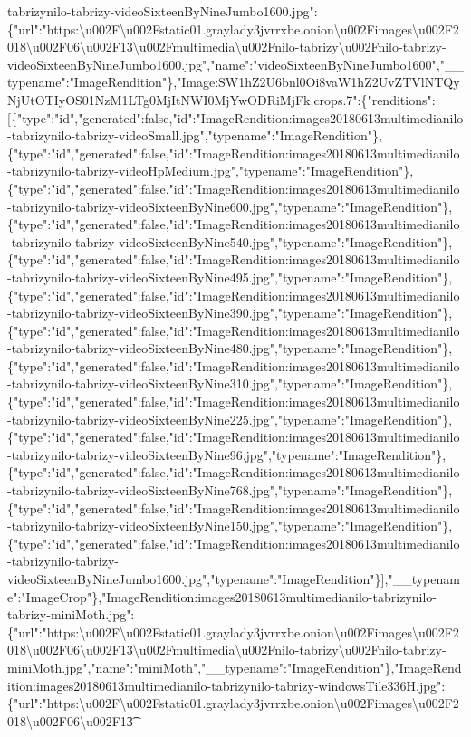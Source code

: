 tabrizynilo-tabrizy-videoSixteenByNineJumbo1600.jpg":\{"url":"https:\textbackslash{}u002F\textbackslash{}u002Fstatic01.graylady3jvrrxbe.onion\textbackslash{}u002Fimages\textbackslash{}u002F2018\textbackslash{}u002F06\textbackslash{}u002F13\textbackslash{}u002Fmultimedia\textbackslash{}u002Fnilo-tabrizy\textbackslash{}u002Fnilo-tabrizy-videoSixteenByNineJumbo1600.jpg","name":"videoSixteenByNineJumbo1600","\_\_typename":"ImageRendition"\},"Image:SW1hZ2U6bnl0Oi8vaW1hZ2UvZTVlNTQyNjUtOTIyOS01NzM1LTg0MjItNWI0MjYwODRiMjFk.crops.7":\{"renditions":{[}\{"type":"id","generated":false,"id":"ImageRendition:images20180613multimedianilo-tabrizynilo-tabrizy-videoSmall.jpg","typename":"ImageRendition"\},\{"type":"id","generated":false,"id":"ImageRendition:images20180613multimedianilo-tabrizynilo-tabrizy-videoHpMedium.jpg","typename":"ImageRendition"\},\{"type":"id","generated":false,"id":"ImageRendition:images20180613multimedianilo-tabrizynilo-tabrizy-videoSixteenByNine600.jpg","typename":"ImageRendition"\},\{"type":"id","generated":false,"id":"ImageRendition:images20180613multimedianilo-tabrizynilo-tabrizy-videoSixteenByNine540.jpg","typename":"ImageRendition"\},\{"type":"id","generated":false,"id":"ImageRendition:images20180613multimedianilo-tabrizynilo-tabrizy-videoSixteenByNine495.jpg","typename":"ImageRendition"\},\{"type":"id","generated":false,"id":"ImageRendition:images20180613multimedianilo-tabrizynilo-tabrizy-videoSixteenByNine390.jpg","typename":"ImageRendition"\},\{"type":"id","generated":false,"id":"ImageRendition:images20180613multimedianilo-tabrizynilo-tabrizy-videoSixteenByNine480.jpg","typename":"ImageRendition"\},\{"type":"id","generated":false,"id":"ImageRendition:images20180613multimedianilo-tabrizynilo-tabrizy-videoSixteenByNine310.jpg","typename":"ImageRendition"\},\{"type":"id","generated":false,"id":"ImageRendition:images20180613multimedianilo-tabrizynilo-tabrizy-videoSixteenByNine225.jpg","typename":"ImageRendition"\},\{"type":"id","generated":false,"id":"ImageRendition:images20180613multimedianilo-tabrizynilo-tabrizy-videoSixteenByNine96.jpg","typename":"ImageRendition"\},\{"type":"id","generated":false,"id":"ImageRendition:images20180613multimedianilo-tabrizynilo-tabrizy-videoSixteenByNine768.jpg","typename":"ImageRendition"\},\{"type":"id","generated":false,"id":"ImageRendition:images20180613multimedianilo-tabrizynilo-tabrizy-videoSixteenByNine150.jpg","typename":"ImageRendition"\},\{"type":"id","generated":false,"id":"ImageRendition:images20180613multimedianilo-tabrizynilo-tabrizy-videoSixteenByNineJumbo1600.jpg","typename":"ImageRendition"\}{]},"\_\_typename":"ImageCrop"\},"ImageRendition:images20180613multimedianilo-tabrizynilo-tabrizy-miniMoth.jpg":\{"url":"https:\textbackslash{}u002F\textbackslash{}u002Fstatic01.graylady3jvrrxbe.onion\textbackslash{}u002Fimages\textbackslash{}u002F2018\textbackslash{}u002F06\textbackslash{}u002F13\textbackslash{}u002Fmultimedia\textbackslash{}u002Fnilo-tabrizy\textbackslash{}u002Fnilo-tabrizy-miniMoth.jpg","name":"miniMoth","\_\_typename":"ImageRendition"\},"ImageRendition:images20180613multimedianilo-tabrizynilo-tabrizy-windowsTile336H.jpg":\{"url":"https:\textbackslash{}u002F\textbackslash{}u002Fstatic01.graylady3jvrrxbe.onion\textbackslash{}u002Fimages\textbackslash{}u002F2018\textbackslash{}u002F06\textbackslash{}u002F13\t
